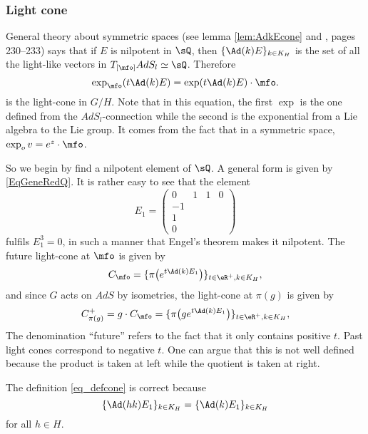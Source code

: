 \subsubsection{Light cone}

General theory about symmetric spaces (see lemma \ref{lem:AdkEcone} and \cite{kobayashi2}, pages 230--233) says that if $E$ is nilpotent in $\sQ$, then $\{\Ad(k)E\}_{k\in K_H}$ is the set of all the light-like vectors in $T_{[\mfo]}AdS_l\simeq\sQ$. Therefore
\begin{equation}
  \exp_{\mfo}( t\Ad(k)E )=\exp(t\Ad(k)E)\cdot\mfo.
\end{equation}
is the light-cone in $G/H$. Note that in this equation, the first $\exp$ is the
one defined from the $AdS_l$-connection
while the second is the exponential from a Lie algebra to the Lie group. It comes from the fact that in a symmetric space, $\exp_o v=e^z\cdot\mfo$.

So we begin by find a nilpotent element of $\sQ$. A general form is given by \eqref{EqGeneRedQ}. It is rather easy to see that the element
\begin{equation}
E_1=
\begin{pmatrix}
0&1&1&0\\
-1\\
1\\
0
\end{pmatrix}
\end{equation}
 fulfils $E_1^3=0$, in such a manner that Engel's theorem 
 makes it nilpotent. The future light-cone at $\mfo$ is given by
\begin{equation}  \label{eq:exprcone}
C_{\mfo}=\{  \pi\big(  e^{t\Ad(k)E_1}  \big)  \}_{t\in\eR^+,k\in K_H},
\end{equation}
and since $G$ acts on $AdS$ by isometries, the light-cone at $\pi(g)$ is given by
\begin{equation} \label{eq_defcone}
  C^+_{\pi(g)}=g\cdot C_{\mfo}=\{  \pi\big( g e^{t\Ad(k)E_1}  \big)  \}_{t\in\eR^+,k\in K_H},
\end{equation}
The denomination ``future'' refers to the fact that it only contains positive $t$. Past light cones correspond to negative $t$.
One can argue that this is not well defined because the product is taken at left while the quotient is taken at right. 

\begin{proposition}
The definition \eqref{eq_defcone} is correct because
\begin{equation}  \label{eq_statdefcone}
  \{ \Ad(hk)E_1 \}_{k\in K_H}=\{ \Ad(k)E_1 \}_{k\in K_H}
\end{equation}
for all $h\in H$. 
\end{proposition}

